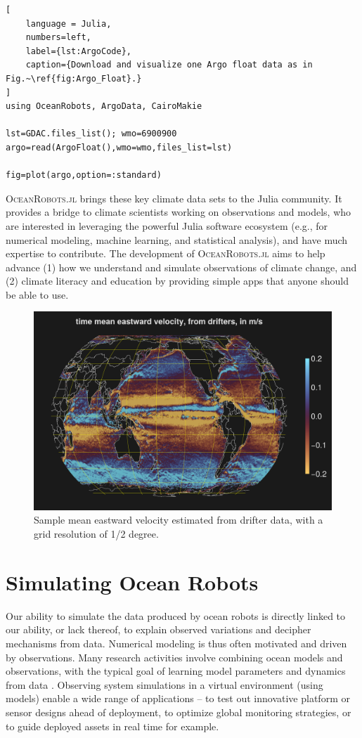 \documentclass{juliacon}[12pt]
\newcommand{\pkg}[1]{{\small \textsc{#1}}}
\begin{document}
\begin{lstlisting}[
    language = Julia,
    numbers=left,
    label={lst:ArgoCode},
    caption={Download and visualize one Argo float data as in Fig.~\ref{fig:Argo_Float}.}
]
using OceanRobots, ArgoData, CairoMakie

lst=GDAC.files_list(); wmo=6900900
argo=read(ArgoFloat(),wmo=wmo,files_list=lst)

fig=plot(argo,option=:standard)
\end{lstlisting}

\pkg{OceanRobots.jl} brings these key climate data sets to the Julia community. It provides a bridge to climate scientists working on observations and models, who are interested in leveraging the powerful Julia software ecosystem (e.g., for numerical modeling, machine learning, and statistical analysis), and have much expertise to contribute. The development of \pkg{OceanRobots.jl} aims to help advance (1) how we understand and simulate observations of climate change, and (2) climate literacy and education by providing simple apps that anyone should be able to use.

\begin{figure}[t]
\centerline{\includegraphics[width=\columnwidth]{figs/20240528_ve_mean.png}}
\caption{Sample mean eastward velocity estimated from drifter data, with a grid resolution of 1/2 degree.}
\label{fig:drifters_ve}
\end{figure}

\section{Simulating Ocean Robots}

Our ability to simulate the data produced by ocean robots is directly linked to our ability, or lack thereof, to explain observed variations and decipher mechanisms from data. Numerical modeling is thus often motivated and driven by observations. Many research activities involve combining ocean models and observations, with the typical goal of learning model parameters and dynamics from data \cite{Forget2010,Forget2015a,FFL15,FP15,Forget2024a}. Observing system simulations in a virtual environment (using models) enable a wide range of applications -- to test out innovative platform or sensor designs ahead of deployment, to optimize global monitoring strategies, or to guide deployed assets in real time for example.
\end{document}
